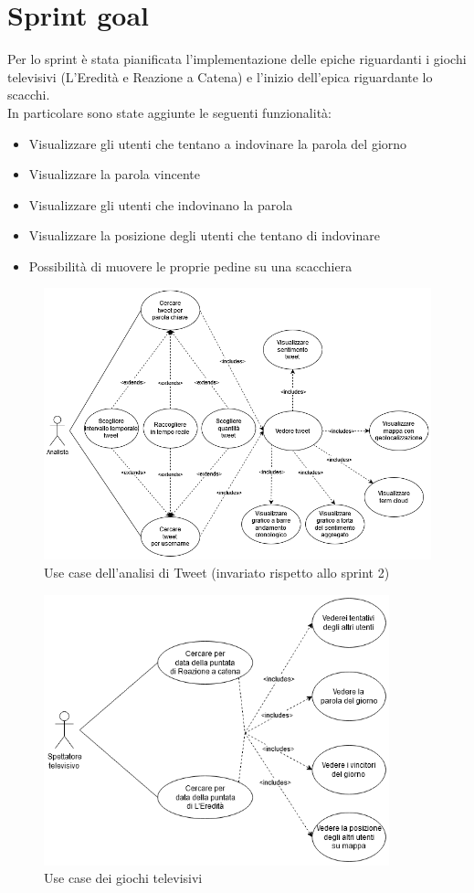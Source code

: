 \documentclass[11pt]{article}
\begin{document}
\section*{Sprint goal}
\justify
Per lo sprint è stata pianificata l'implementazione delle epiche riguardanti i giochi televisivi (L'Eredità e Reazione a Catena) e
l'inizio dell'epica riguardante lo scacchi.\\
In particolare sono state aggiunte le seguenti funzionalità:
\begin{itemize}
    \item Visualizzare gli utenti che tentano a indovinare la parola del giorno
    \item Visualizzare la parola vincente
    \item Visualizzare gli utenti che indovinano la parola
    \item Visualizzare la posizione degli utenti che tentano di indovinare
    \item Possibilità di muovere le proprie pedine su una scacchiera
\end{itemize}


\begin{figure}[H]
    \centering
    \includegraphics[width=12cm]{./img/tweet_usecase.png}
    \caption{Use case dell'analisi di Tweet (invariato rispetto allo sprint 2)}
\end{figure}

\begin{figure}[H]
    \centering
    \includegraphics[width=10cm]{./img/tvgames_usecase.png}
    \caption{Use case dei giochi televisivi}
\end{figure}
\end{document}
